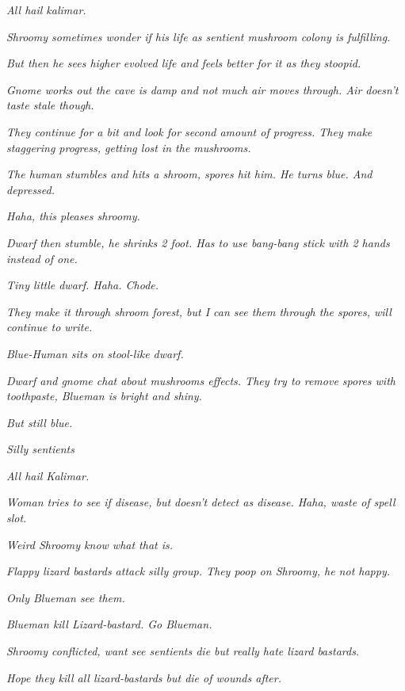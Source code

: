 \textit{All hail kalimar.}\medskip

\textit{Shroomy sometimes wonder if his life as sentient mushroom colony is fulfilling.}\medskip

\textit{But then he sees higher evolved life and feels better for it as they stoopid.}\medskip

\textit{Gnome works out the cave is damp and not much air moves through. Air doesn’t taste stale though.}\medskip

\textit{They continue for a bit and look for second amount of progress. They make staggering progress, getting lost in the mushrooms.}\medskip

\textit{The human stumbles and hits a shroom, spores hit him. He turns blue. And depressed.}\medskip

\textit{Haha, this pleases shroomy.}\medskip

\textit{Dwarf then stumble, he shrinks 2 foot. Has to use bang-bang stick with 2 hands instead of one.}\medskip

\textit{Tiny little dwarf. Haha. Chode.}\medskip

\textit{They make it through shroom forest, but I can see them through the spores, will continue to write.}\medskip

\textit{Blue-Human sits on stool-like dwarf.}\medskip

\textit{Dwarf and gnome chat about mushrooms effects. They try to remove spores with toothpaste, Blueman is bright and shiny.}\medskip

\textit{But still blue.}\medskip

\textit{Silly sentients}\medskip

\textit{All hail Kalimar.}\medskip

\textit{Woman tries to see if disease, but doesn’t detect as disease. Haha, waste of spell slot.}\medskip

\textit{Weird Shroomy know what that is.}\medskip

\textit{Flappy lizard bastards attack silly group. They poop on Shroomy, he not happy.}\medskip

\textit{Only Blueman see them.}\medskip

\textit{Blueman kill Lizard-bastard. Go Blueman.}\medskip

\textit{Shroomy conflicted, want see sentients die but really hate lizard bastards.}\medskip

\textit{Hope they kill all lizard-bastards but die of wounds after.}\medskip

